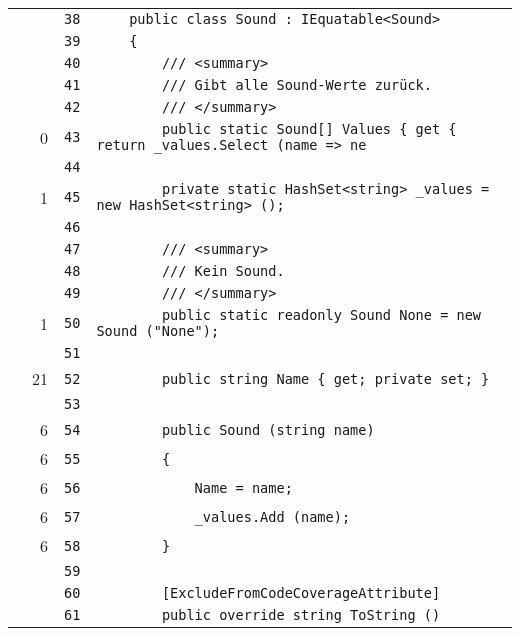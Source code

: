 \documentclass[a4paper,10pt]{article}
\begin{document}
\begin{longtable}[l]{lrrl}
\cellcolor{gray} &  & \verb~38~ & \verb~    public class Sound : IEquatable<Sound>~\\
\cellcolor{gray} &  & \verb~39~ & \verb~    {~\\
\cellcolor{gray} &  & \verb~40~ & \verb~        /// <summary>~\\
\cellcolor{gray} &  & \verb~41~ & \verb~        /// Gibt alle Sound-Werte zurück.~\\
\cellcolor{gray} &  & \verb~42~ & \verb~        /// </summary>~\\
\cellcolor{red} & 0 & \verb~43~ & \verb~        public static Sound[] Values { get { return _values.Select (name => ne~\\
\cellcolor{gray} &  & \verb~44~ & \verb~~\\
\cellcolor{green} & 1 & \verb~45~ & \verb~        private static HashSet<string> _values = new HashSet<string> ();~\\
\cellcolor{gray} &  & \verb~46~ & \verb~~\\
\cellcolor{gray} &  & \verb~47~ & \verb~        /// <summary>~\\
\cellcolor{gray} &  & \verb~48~ & \verb~        /// Kein Sound.~\\
\cellcolor{gray} &  & \verb~49~ & \verb~        /// </summary>~\\
\cellcolor{green} & 1 & \verb~50~ & \verb~        public static readonly Sound None = new Sound ("None");~\\
\cellcolor{gray} &  & \verb~51~ & \verb~~\\
\cellcolor{green} & 21 & \verb~52~ & \verb~        public string Name { get; private set; }~\\
\cellcolor{gray} &  & \verb~53~ & \verb~~\\
\cellcolor{green} & 6 & \verb~54~ & \verb~        public Sound (string name)~\\
\cellcolor{green} & 6 & \verb~55~ & \verb~        {~\\
\cellcolor{green} & 6 & \verb~56~ & \verb~            Name = name;~\\
\cellcolor{green} & 6 & \verb~57~ & \verb~            _values.Add (name);~\\
\cellcolor{green} & 6 & \verb~58~ & \verb~        }~\\
\cellcolor{gray} &  & \verb~59~ & \verb~~\\
\cellcolor{gray} &  & \verb~60~ & \verb~        [ExcludeFromCodeCoverageAttribute]~\\
\cellcolor{gray} &  & \verb~61~ & \verb~        public override string ToString ()~\\

\end{longtable}
\end{document}
